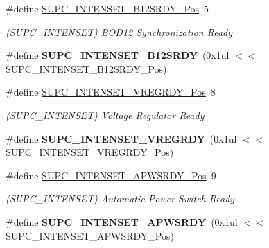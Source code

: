 \begin{DoxyCompactItemize}
\item 
\hypertarget{group___s_a_m_l21___s_u_p_c_gaaf942b8883bfa8854c08d43f1df829b9}{}\#define \hyperlink{group___s_a_m_l21___s_u_p_c_gaaf942b8883bfa8854c08d43f1df829b9}{S\+U\+P\+C\+\_\+\+I\+N\+T\+E\+N\+S\+E\+T\+\_\+\+B12\+S\+R\+D\+Y\+\_\+\+Pos}~5\label{group___s_a_m_l21___s_u_p_c_gaaf942b8883bfa8854c08d43f1df829b9}

\begin{DoxyCompactList}\small\item\em (S\+U\+P\+C\+\_\+\+I\+N\+T\+E\+N\+S\+E\+T) B\+O\+D12 Synchronization Ready \end{DoxyCompactList}\item 
\hypertarget{group___s_a_m_l21___s_u_p_c_gac16a0e9ffb2f08a88797214b09bfa63d}{}\#define {\bfseries S\+U\+P\+C\+\_\+\+I\+N\+T\+E\+N\+S\+E\+T\+\_\+\+B12\+S\+R\+D\+Y}~(0x1ul $<$$<$ S\+U\+P\+C\+\_\+\+I\+N\+T\+E\+N\+S\+E\+T\+\_\+\+B12\+S\+R\+D\+Y\+\_\+\+Pos)\label{group___s_a_m_l21___s_u_p_c_gac16a0e9ffb2f08a88797214b09bfa63d}

\item 
\hypertarget{group___s_a_m_l21___s_u_p_c_ga00dc8c27e11d3e23195aeb5ad0fe2ec5}{}\#define \hyperlink{group___s_a_m_l21___s_u_p_c_ga00dc8c27e11d3e23195aeb5ad0fe2ec5}{S\+U\+P\+C\+\_\+\+I\+N\+T\+E\+N\+S\+E\+T\+\_\+\+V\+R\+E\+G\+R\+D\+Y\+\_\+\+Pos}~8\label{group___s_a_m_l21___s_u_p_c_ga00dc8c27e11d3e23195aeb5ad0fe2ec5}

\begin{DoxyCompactList}\small\item\em (S\+U\+P\+C\+\_\+\+I\+N\+T\+E\+N\+S\+E\+T) Voltage Regulator Ready \end{DoxyCompactList}\item 
\hypertarget{group___s_a_m_l21___s_u_p_c_gaa98a8f5d4305943d118c13b42e236f16}{}\#define {\bfseries S\+U\+P\+C\+\_\+\+I\+N\+T\+E\+N\+S\+E\+T\+\_\+\+V\+R\+E\+G\+R\+D\+Y}~(0x1ul $<$$<$ S\+U\+P\+C\+\_\+\+I\+N\+T\+E\+N\+S\+E\+T\+\_\+\+V\+R\+E\+G\+R\+D\+Y\+\_\+\+Pos)\label{group___s_a_m_l21___s_u_p_c_gaa98a8f5d4305943d118c13b42e236f16}

\item 
\hypertarget{group___s_a_m_l21___s_u_p_c_ga6fe71b4d97ff35b3712a9b747f32faf6}{}\#define \hyperlink{group___s_a_m_l21___s_u_p_c_ga6fe71b4d97ff35b3712a9b747f32faf6}{S\+U\+P\+C\+\_\+\+I\+N\+T\+E\+N\+S\+E\+T\+\_\+\+A\+P\+W\+S\+R\+D\+Y\+\_\+\+Pos}~9\label{group___s_a_m_l21___s_u_p_c_ga6fe71b4d97ff35b3712a9b747f32faf6}

\begin{DoxyCompactList}\small\item\em (S\+U\+P\+C\+\_\+\+I\+N\+T\+E\+N\+S\+E\+T) Automatic Power Switch Ready \end{DoxyCompactList}\item 
\hypertarget{group___s_a_m_l21___s_u_p_c_ga701d47b82dbdac90c05698ff2582b480}{}\#define {\bfseries S\+U\+P\+C\+\_\+\+I\+N\+T\+E\+N\+S\+E\+T\+\_\+\+A\+P\+W\+S\+R\+D\+Y}~(0x1ul $<$$<$ S\+U\+P\+C\+\_\+\+I\+N\+T\+E\+N\+S\+E\+T\+\_\+\+A\+P\+W\+S\+R\+D\+Y\+\_\+\+Pos)\label{group___s_a_m_l21___s_u_p_c_ga701d47b82dbdac90c05698ff2582b480}


\end{DoxyCompactItemize}
